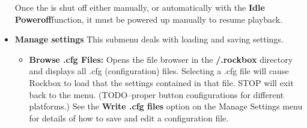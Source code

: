 \begin{itemize}
{      Once the \dap is shut off either manually, or automatically with the \textbf{Idle Poweroff}function, it must be powered up manually to resume playback.
    }
    
  \item \textbf{Manage settings}
    This submenu deals with loading and saving settings.  
    
    \begin{itemize}
    \item \textbf{Browse .cfg Files: }
      Opens the file browser in the \textbf{/.rockbox} directory and displays all .cfg (configuration) files.  Selecting a .cfg file will cause Rockbox to load that the settings contained in that file.  STOP will exit back to the menu. (TODO--proper button configurations for different platforms.)  See the \textbf{Write .cfg files} option on the Manage Settings menu for details of how to save and edit a configuration file.

\end{itemize}
\end{itemize}
